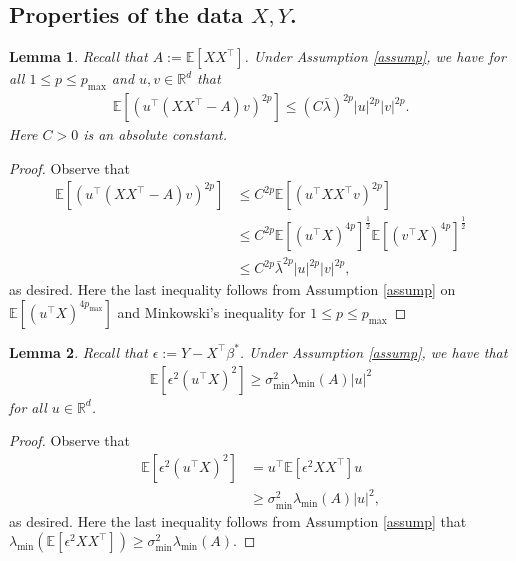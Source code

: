 \documentclass[11pt, reqno,english]{amsart}
\newtheorem{lemma}{Lemma}[section]
\begin{document}
\subsection{Properties of the data $X,Y$.}
\begin{lemma}\label{X-moment-upper-bound}
Recall that $A := \mathbb{E}[XX^\top]$. Under Assumption \ref{assump}, we have for all $1 \leq p \leq p_{\max}$ and $u, v \in \mathbb{R}^d$ that
\begin{align*}
    \mathbb{E}[(u^\top (XX^\top - A)v)^{2p}] \leq (C \bar{\lambda})^{2p} |u|^{2p} |v|^{2p}.
\end{align*}
Here $C > 0$ is an absolute constant. 
\end{lemma}
\begin{proof}
Observe that 
\begin{align*}
\mathbb{E}[(u^\top (XX^\top - A)v)^{2p}] &\leq C^{2p} \mathbb{E}[(u^\top  XX^\top v)^{2p}]
\\
&\leq C^{2p}\mathbb{E}[(u^\top X)^{4p}]^{\frac{1}{2}}\mathbb{E}[(v^\top X)^{4p}]^{\frac{1}{2}}
\\
&\leq C^{2p}\bar{\lambda}^{2p} |u|^{2p}|v|^{2p},
\end{align*}
as desired. Here the last inequality follows from Assumption \ref{assump} on $\mathbb{E}[(u^\top X)^{4p_{\max}}]$ and Minkowski's inequality for $1 \leq p \leq p_{\max}$
\end{proof}
\begin{lemma}\label{noise-moment-lower-bound}
Recall that $\epsilon := Y - X^\top \beta^*$. Under Assumption \ref{assump}, we have that
\begin{align*}
\mathbb{E}[\epsilon^2 (u^\top X)^2]\geq \sigma_{\min}^2 \lambda_{\min}(A)|u|^2
\end{align*}
for all $u \in \mathbb{R}^d$. 
\end{lemma}
\begin{proof}
Observe that
\begin{align*}
\mathbb{E}[\epsilon^2 (u^\top X)^2] &= u^\top \mathbb{E}[\epsilon^2 XX^\top] u
\\
&\geq \sigma^2_{\min} \lambda_{\min}(A) |u|^2,
\end{align*}
as desired. Here the last inequality follows from Assumption \ref{assump} that $\lambda_{\min}(\mathbb{E}[\epsilon^2 XX^\top]) \geq \sigma^2_{\min} \lambda_{\min}(A)$. 
\end{proof}
\end{document}

